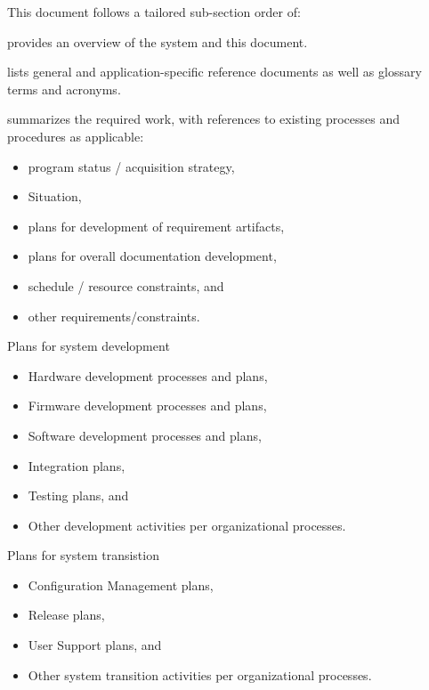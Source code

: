 This document follows a tailored \SVD sub-section order of:
\begin{description}[itemindent=5pt,topsep=0pt,itemsep=0pt,partopsep=0pt, parsep=0pt]
	\item[Section 1] provides an overview of the system and this document.
	\item[Section 2] lists general and application-specific reference documents as well as glossary terms and acronyms. 
	\item[Section 3] summarizes the required work, with references to existing \QMS processes and procedures as applicable:
	\begin{itemize}[topsep=0pt,itemsep=0pt,partopsep=0pt, parsep=0pt]
		\item program status / acquisition strategy,
		\item \SDLC Situation,
		\item plans for development of requirement artifacts,
		\item plans for overall documentation development,
		\item schedule / resource constraints, and
		\item other requirements/constraints.
	\end{itemize}
	\item[Section 4] Plans for system development
		\begin{itemize}[topsep=0pt,itemsep=0pt,partopsep=0pt, parsep=0pt]
			\item Hardware development processes and plans,
			\item Firmware development processes and plans,
			\item Software development processes and plans,
			\item Integration plans,
			\item Testing plans, and
			\item Other development activities per organizational processes.
		\end{itemize}
		\item[Section 5] Plans for system transistion
		\begin{itemize}[topsep=0pt,itemsep=0pt,partopsep=0pt, parsep=0pt]
			\item Configuration Management plans,
			\item Release plans,
			\item User Support plans, and
			\item Other system transition activities per organizational processes.
		\end{itemize}

\end{description}
